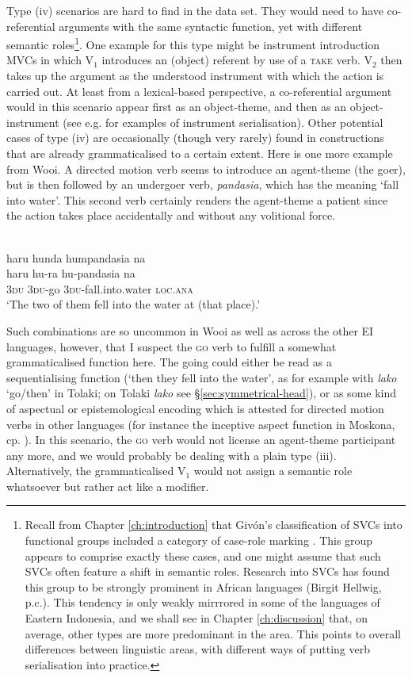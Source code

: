 Type (iv) scenarios are hard to find in the data set. They would need to have co-referential arguments with the same syntactic function, yet with different semantic roles\footnote{Recall from Chapter \ref{ch:introduction} that Givón's classification of SVCs into functional groups included a category of case-role marking \citep{givon1991serial}. This group appears to comprise exactly these cases, and one might assume that such SVCs often feature a shift in semantic roles. Research into SVCs has found this group to be strongly prominent in African languages (Birgit Hellwig, p.c.). This tendency is only weakly mirrrored in some of the languages of Eastern Indonesia, and we shall see in Chapter \ref{ch:discussion} that, on average, other types are more predominant in the area. This points to overall differences between linguistic areas, with different ways of putting verb serialisation into practice.}. One example for this type might be instrument introduction MVCs in which V$_1$ introduces an (object) referent by use of a \textsc{take} verb. V$_2$ then takes up the argument as the understood instrument with which the action is carried out. At least from a lexical-based perspective, a co-referential argument would in this scenario appear first as an object-theme, and then as an object-instrument (see e.g. \citealt[305]{Durie1997} for examples of instrument serialisation). Other potential cases of type (iv) are occasionally (though very rarely) found in constructions that are already grammaticalised to a certain extent. Here is one more example from Wooi. A directed motion verb seems to introduce an agent-theme (the goer), but is then followed by an undergoer verb, \textit{pandasia}, which has the meaning `fall into water'. This second verb certainly renders the agent-theme a patient since the action takes place accidentally and without any volitional force.

\ea \label{}
\\
\glll haru hunda humpandasia na \\
haru hu-ra hu-pandasia na \\
3\textsc{du} 3\textsc{du}-go 3\textsc{du}-fall.into.water \textsc{loc}.\textsc{ana} \\
\glft `The two of them fell into the water at (that place).'\\ 
\z

Such combinations are so uncommon in Wooi as well as across the other EI languages, however, that I suspect the \textsc{go} verb to fulfill a somewhat grammaticalised function here. The going could either be read as a sequentialising function (`then they fell into the water', as for example with \textit{lako} `go/then' in Tolaki; on Tolaki \textit{lako} see §\ref{sec:symmetrical-head}), or as some kind of aspectual or epistemological encoding which is attested for directed motion verbs in other languages (for instance the inceptive aspect function in Moskona, cp. \citealt[297]{gravelle2010grammar}). In this scenario, the \textsc{go} verb would not license an agent-theme participant any more, and we would probably be dealing with a plain type (iii). Alternatively, the grammaticalised V$_1$ would not assign a semantic role whatsoever but rather act like a modifier.

